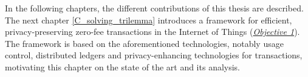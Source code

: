 In the following chapters, the different contributions of this thesis are described. The next chapter \ref{C_solving_trilemma} introduces a framework for efficient, privacy-preserving zero-fee transactions in the Internet of Things (\hyperref[obj:1]{\emph{Objective 1}}).
The framework is based on the aforementioned technologies, notably usage control, distributed ledgers and privacy-enhancing technologies 
for transactions, motivating this chapter on the state of the art and its analysis.

